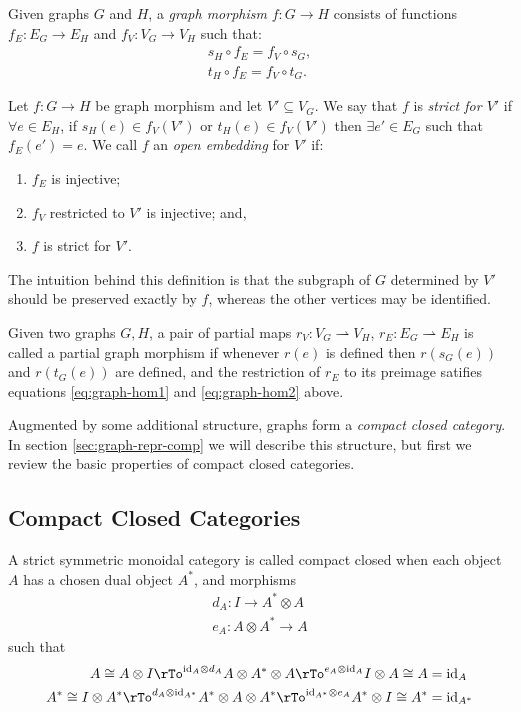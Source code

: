 \documentclass[runningheads]{llncs}
\newcommand{\iso}{\cong}
\newcommand{\id}[1]{\ensuremath{\mathrm{id}_{#1}}}
\begin{document}
Given graphs $G$ and $H$, a \emph{graph morphism} $f : G\to H$ consists of
functions $f_E : E_G \to E_H$ and $f_V:V_G\to V_H$ such that:
\begin{gather}
  s_H\circ f_E = f_V \circ s_G,\label{eq:graph-hom1}\\
  t_H\circ f_E = f_V \circ t_G\label{eq:graph-hom2}.
\end{gather}

Let $f: G \to H$ be  graph morphism and  let $V' \subseteq V_G$. We say
that $f$ is \emph{strict for $V'$} if $\forall e \in E_H$, if $s_H(e)
\in f_V(V')$ or $t_H(e) \in f_V(V')$ then $\exists e' \in E_G$ such
that $f_E(e') = e$.  We call $f$ an \emph{open embedding} for $V'$ if:
\begin{enumerate}
\item $f_E$ is injective;
\item $f_V$ restricted to $V'$ is injective; and,
\item $f$ is strict for $V'$.
\end{enumerate}
The intuition behind this definition is that the subgraph of $G$
determined by $V'$ should be preserved exactly by $f$, whereas the
other vertices may be identified.

Given two graphs $G,H$, a pair of partial maps $r_V: V_G
\rightharpoonup V_H$, $r_E: E_G \rightharpoonup E_H$ is called a
partial graph morphism if whenever $r(e)$ is defined then $r(s_G(e))$
and $r(t_G(e))$ are defined, and the restriction of $r_E$ to its
preimage satifies equations \eqref{eq:graph-hom1} and
\eqref{eq:graph-hom2} above.

Augmented by some additional structure, graphs form a \emph{compact closed
category}.  In section \ref{sec:graph-repr-comp} we will describe this
structure, but first we review the basic properties of compact closed
categories.

\subsection{Compact Closed Categories}
\label{sec:comp-clos-categ}

\begin{definition}
A strict symmetric monoidal  category
\cite{MacLane:CatsWM:1971,AspLon:CatTypStruct:1991} is called compact 
closed \cite{KelLap:comcl:1980} when each object $A$ has a chosen dual
object $A^*$, and morphisms
\begin{gather*}
  d_A : I \to A^* \otimes A\\
  e_A : A \otimes A^* \to A
\end{gather*}
such that
\begin{align}
  A \iso A \otimes I \rTo^{\id{A} \otimes d_A} A \otimes A^* \otimes A
  \rTo^{e_A \otimes \id{A}} I \otimes A \iso A & = \id{A} \label{eq:comcl1}\\
  A^* \iso I \otimes A^* \rTo^{ d_A \otimes \id{A^*}} A^* \otimes A
  \otimes A^* \rTo^{\id{A^*} \otimes e_A} A^* \otimes I \iso A^* & =
  \id{A^*} \label{eq:comcl2}
\end{align}
\end{definition}
\end{document}
